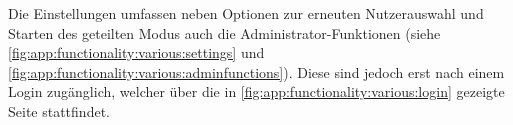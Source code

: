 Die Einstellungen umfassen neben Optionen zur erneuten Nutzerauswahl und Starten des geteilten Modus auch die Administrator-Funktionen (siehe \autoref{fig:app:functionality:various:settings} und \autoref{fig:app:functionality:various:adminfunctions}).
Diese sind jedoch erst nach einem Login zugänglich, welcher über die in \autoref{fig:app:functionality:various:login} gezeigte Seite stattfindet.
\begin{figure}%
	\centering
	\qquad
	\qquad

\end{figure}

